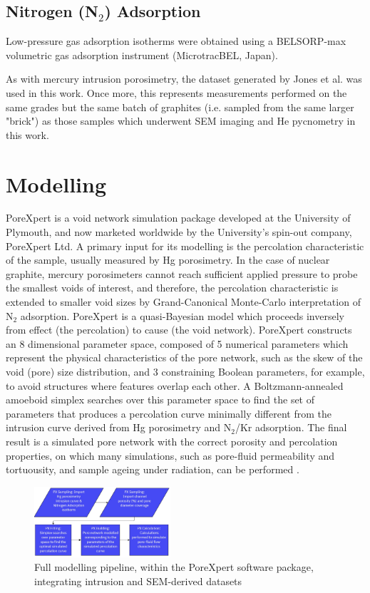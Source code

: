 \documentclass[3p,twocolumn]{elsarticle}
\begin{document}
\subsection{Nitrogen (N$_2$) Adsorption}
Low-pressure gas adsorption isotherms were obtained using a BELSORP-max
volumetric gas adsorption instrument (MicrotracBEL, Japan). 

As with mercury intrusion porosimetry, the dataset generated by Jones et al.
\citep{Jones2018} was used in this work. Once more, this represents measurements
performed on the same grades but the same batch of graphites (i.e. sampled from
the same larger "brick") as those samples which underwent SEM imaging and He
pycnometry in this work.

\section{Modelling}
PoreXpert is a void network simulation package developed at the University of
Plymouth, and now marketed worldwide by the University's spin-out company,
PoreXpert Ltd. A primary input for its modelling is the percolation
characteristic of the sample, usually measured by Hg porosimetry.  In the case
of nuclear graphite, mercury porosimeters cannot reach sufficient applied
pressure to probe the smallest voids of interest, and therefore, the percolation
characteristic is extended to smaller void sizes by Grand-Canonical Monte-Carlo
interpretation of N$_2$ adsorption.  PoreXpert is a quasi-Bayesian model which
proceeds inversely from effect (the percolation) to cause (the void network).
PoreXpert constructs an 8 dimensional parameter space,  composed of 5 numerical
parameters which represent the physical characteristics of the pore network,
such as the skew of the void (pore) size distribution, and 3 constraining
Boolean parameters, for example, to avoid structures where features overlap each
other. A Boltzmann-annealed amoeboid simplex searches over this parameter space
to find the set of parameters that produces a percolation curve minimally
different from the intrusion curve derived from Hg porosimetry and N$_2$/Kr
adsorption. The final result is a simulated pore network with the correct
porosity and percolation properties, on which many simulations, such as
pore-fluid permeability and tortuousity, and sample ageing under radiation, can
be performed \citep{MatthewsPoreXpert2025}.

\begin{figure}[!htbp]
    \centering
    \includegraphics[width=0.45\textwidth]{./Media/Modelling Pipeline.jpg.jpg}
    \caption{Full modelling pipeline, within the PoreXpert software package, integrating intrusion and SEM-derived datasets}
    \label{fig:modelling pipeline}
\end{figure}
\end{document}
